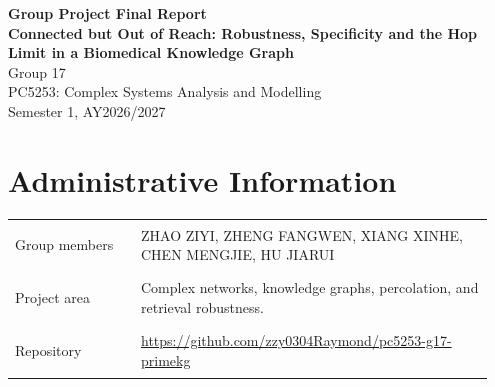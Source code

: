 \documentclass[11pt]{article}
\newcommand{\course}{PC5253: Complex Systems Analysis and Modelling}
\newcommand{\semester}{Semester 1, AY2026/2027}
\newcommand{\projecttitle}{Connected but Out of Reach: Robustness, Specificity and the Hop Limit in a Biomedical Knowledge Graph}
\newcommand{\groupid}{17}
\begin{document}
\begin{center}
{\LARGE\bfseries Group Project Final Report}\\[0.6em]
{\large\bfseries \projecttitle}\\[0.9em]
Group \groupid\\[0.5em]
\course\\
\semester
\end{center}

\section*{Administrative Information}
\begin{tabular}{@{}>{\bfseries\raggedright\arraybackslash}p{0.25\linewidth}>{\raggedright\arraybackslash}p{0.70\linewidth}@{}}
Group members & ZHAO ZIYI, ZHENG FANGWEN, XIANG XINHE, CHEN MENGJIE, HU JIARUI \\[0.7em]
Project area & Complex networks, knowledge graphs, percolation, and retrieval robustness. \\[0.7em]
Repository & \url{https://github.com/zzy0304Raymond/pc5253-g17-primekg} \\
\end{tabular}

\begin{abstract}
\noindent
The health of a knowledge graph is usually judged by its giant component. We ask
whether that statistic says anything about the short typed paths that
drug-repurposing methods and retrieval-augmented models follow. On the
drug--protein--disease graph of PrimeKG (30,968 nodes) we use 6,233 approved
indications, which the graph itself does not contain, as ground truth against
degree-preserving decoys. Removing half of the edges at random leaves 86\% of
nodes in the giant component and 91\% of two-hop indications connected by some
path, but only 40\% keep their two-hop link. Those short paths carry most of the
evidence: a shared protein links 31\% of indications but 14\% of decoys, while at
four hops the two sets are nearly indistinguishable, as a parameter-free model
of chance paths predicts to within one percentage point. The excess of real
over chance paths falls three- to five-fold per hop, because chance paths
multiply about four times faster than the real signal. Two-hop survival is an
exact reliability polynomial, which is why theory and simulation agree to Monte
Carlo precision. Removing the 5\% of nodes with the highest degree costs
connectivity 13 percentage points more than random removal, but costs the
indications 83\% of their two-hop links against 12\%, lost half through hub
diseases and half through routes, which are size-biased towards hub proteins; real
indications avoid those proteins, and removing them lowers recall but raises
specificity. A controlled 5,000-node sample tests each approximation. The hop
limit thus acts as a resolution: short horizons see specific but fragile
structure, long ones robust but generic structure. As an avalanche exponent is
incomplete without its bin width, a robustness claim is incomplete without its
horizon, null model and sampling.
\end{abstract}
\end{document}
